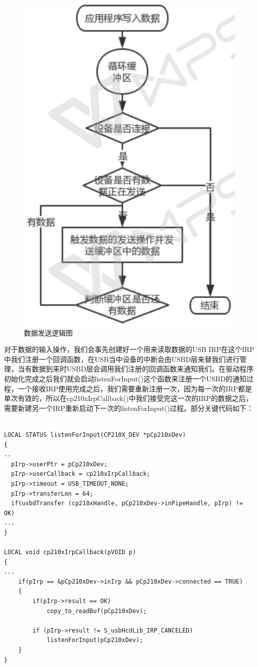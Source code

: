 \begin{figure}[!h]
\centering
\includegraphics[width=.7\textwidth]{./graphics/data-send-diagram.pdf}
\caption{数据发送逻辑图}\label{fig:outData-diagram}
\end{figure}


	对于数据的输入操作，我们会事先创建好一个用来读取数据的USB IRP在这个IRP中我们注册一个回调函数，在USB当中设备的中断会由USBD层来替我们进行管理，当有数据到来时USBD层会调用我们注册的回调函数来通知我们。在驱动程序初始化完成之后我们就会启动listenForInput()这个函数来注册一个USBD的通知过程，一个接收IRP使用完成之后，我们需要重新注册一次，因为每一次的IRP都是单次有效的，所以在cp210xIrpCallback()中我们接受完这一次的IRP的数据之后， 需要新建另一个IRP重新启动下一次的listenForInput()过程。部分关键代码如下：
\lstset{language=C}
\begin{lstlisting}

LOCAL STATUS listenForInput(CP210X_DEV *pCp210xDev)
{
..
  pIrp->userPtr = pCp210xDev;
  pIrp->userCallback = cp210xIrpCallback;
  pIrp->timeout = USB_TIMEOUT_NONE;
  pIrp->transferLen = 64;
  if(usbdTransfer (cp210xHandle, pCp210xDev->inPipeHandle, pIrp) != OK)
...
}

LOCAL void cp210xIrpCallback(pVOID p)
{
...
	if(pIrp == &pCp210xDev->inIrp && pCp210xDev->connected == TRUE)
	{
		if(pIrp->result == OK)
			copy_to_readBuf(pCp210xDev);
			
		if (pIrp->result != S_usbHcdLib_IRP_CANCELED)
			listenForInput(pCp210xDev);
	}
}

\end{lstlisting}

